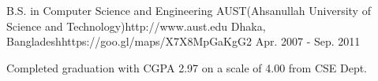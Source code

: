 

\begin{workentries}

  \workentry
    {B.S. in Computer Science and Engineering} %
    {AUST(Ahsanullah University of Science and Technology)}{http://www.aust.edu} %
    {Dhaka, Bangladesh}{https://goo.gl/maps/X7X8MpGaKgG2} %
    {Apr. 2007 - Sep. 2011} %
    {
      \begin{workitems} %
        \item {Completed graduation with CGPA 2.97 on a scale of 4.00 from CSE Dept.}
      \end{workitems}
    }

\end{workentries}
